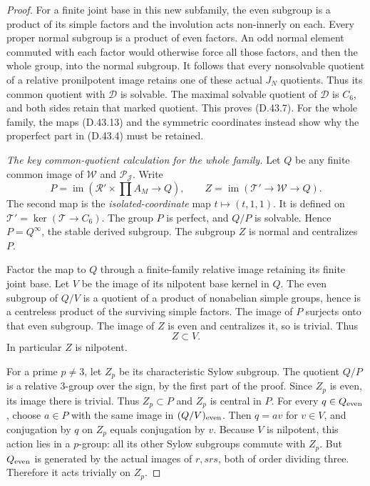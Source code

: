 \begin{proof}
For a finite joint base
in this new subfamily,
the even subgroup is
a product of its simple
factors and the involution
acts non-innerly on each.
Every proper normal
subgroup is a product
of even factors. An
odd normal element
commuted with each
factor would otherwise
force all those factors,
and then the whole group,
into the normal subgroup.
It follows that every
nonsolvable quotient
of a relative
pronilpotent image
retains one of these
actual $J_N$ quotients.
Thus its common quotient
with $\mathcal D$ is
solvable. The maximal
solvable quotient of
$\mathcal D$ is $C_6$,
and both sides retain
that marked quotient.
This proves (D.43.7).
For the whole family,
the maps (D.43.13)
and the symmetric
coordinates instead
show why the properfect
part in (D.43.4)
must be retained.

\emph{The key common-quotient calculation for the whole family.}
Let $Q$ be any finite common
image of $\mathcal W$ and
$\mathcal P_{\mathscr J}$.
Write
\[
 P=\operatorname{im}\left(
      \mathcal R'\times\prod A_M\longrightarrow Q\right),
 \qquad
 Z=\operatorname{im}\left(
      \mathcal T'\longrightarrow\mathcal W
                               \longrightarrow Q\right).
                                                               \tag{D.43.14}
\]
The second map is the
\emph{isolated-coordinate}
map $t\mapsto(t,1,1)$.
It is defined on
$\mathcal T'=\ker(\mathcal T\to C_6)$.
The group $P$ is perfect,
and $Q/P$ is solvable.
Hence $P=Q^\infty$,
the stable derived
subgroup. The subgroup
$Z$ is normal and
centralizes $P$.

Factor the map to $Q$
through a finite-family
relative image retaining
its finite joint base.
Let $V$ be the image
of its nilpotent base
kernel in $Q$.
The even subgroup of
$Q/V$ is a quotient
of a product of
nonabelian simple
groups, hence is
a centreless product
of the surviving
simple factors.
The image of $P$
surjects onto that
even subgroup.
The image of $Z$
is even and centralizes
it, so is trivial.
Thus
\[
                    Z\subset V.                              \tag{D.43.15}
\]
In particular $Z$
is nilpotent.

For a prime $p\ne3$,
let $Z_p$ be its
characteristic Sylow
subgroup. The quotient
$Q/P$ is a relative
$3$-group over the
sign, by the first
part of the proof.
Since $Z_p$ is even,
its image there is
trivial. Thus
$Z_p\subset P$ and
$Z_p$ is central in
$P$. For every
$q\in Q_{\rm even}$,
choose $a\in P$
with the same image
in $(Q/V)_{\rm even}$.
Then $q=av$ for
$v\in V$, and
conjugation by $q$
on $Z_p$ equals
conjugation by $v$.
Because $V$ is
nilpotent, this
action lies in a
$p$-group: all
its other Sylow
subgroups commute
with $Z_p$.
But $Q_{\rm even}$
is generated by
the actual images
of $r,srs$, both
of order dividing
three. Therefore
it acts trivially
on $Z_p$.


\end{proof}
